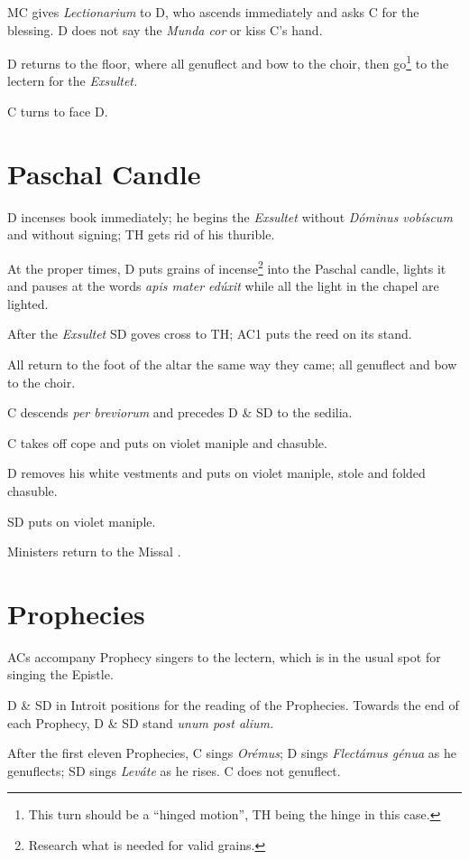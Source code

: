 {\rubric MC gives \textit{Lectionarium} to D, who ascends immediately and asks C
for the blessing. D does not say the \textit{Munda cor} or kiss C's hand.

\rubric D returns to the floor, where all genuflect and bow to the choir, then
go\footnote{This turn should be a ``hinged motion'', TH being the hinge in this
case.} to the lectern for the \textit{Exsultet.}

\rubric C turns to face D.

\section{Paschal Candle}

\rubric D incenses book immediately; he begins the \textit{Exsultet} without
\textit{Dóminus vobíscum} and without signing; TH gets rid of his thurible.

\rubric At the proper times, D puts grains of incense\footnote{Research what is
needed for valid grains.} into the Paschal candle, lights it and pauses at the
words \textit{apis mater edúxit} while all the light in the chapel are lighted.

\rubric After the \textit{Exsultet} SD goves cross to TH; AC1 puts the reed on
its stand.

\rubric All return to the foot of the altar the same way they came; all
genuflect and bow to the choir.

\rubric C descends \textit{per breviorum} and precedes D \& SD to the sedilia.

\rubric C takes off cope and puts on violet maniple and chasuble.

\rubric D removes his white vestments and puts on violet maniple, stole and
folded chasuble.

\rubric SD puts on violet maniple.

\rubric Ministers return to the Missal \pbr.

\section{Prophecies}

\rubric ACs accompany Prophecy singers to the lectern, which is in the usual
spot for singing the Epistle.

\rubric D \& SD in Introit positions for the reading of the Prophecies. Towards
the end of each Prophecy, D \& SD stand \textit{unum post alium.}

\rubric After the first eleven Prophecies, C sings \textit{Orémus}; D sings
\textit{Flectámus génua} as he genuflects; SD sings \textit{Leváte} as he
rises. C does not genuflect.

}
